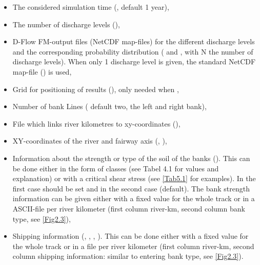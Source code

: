 \begin{itemize}
\item The considered simulation time (, default 1 year),
\item The number of discharge levels (),
\item D-Flow FM-output files (NetCDF map-files) for the different discharge levels and the corresponding probability distribution ( and , with N the number of discharge levels).
When only 1 discharge level is given, the standard NetCDF map-file () is used,
\item Grid for positioning of results (), only needed when ,
\item Number of bank Lines ( default two, the left and right bank),
\item File which links river kilometres to xy-coordinates (),
\item XY-coordinates of the river and fairway axis (, ),
\item Information about the strength or type of the soil of the banks ().
This can be done either in the form of classes (see Tabel 4.1 for values and explanation) or with a critical shear stress (see \autoref{Tab5.1} for examples).
In the first case  should be set and in the second case  (default).
The bank strength information can be given either with a fixed value for the whole track or in a ASCII-file per river kilometer (first column river-km, second column bank type, see \autoref{Fig2.3}),
\item Shipping information (, , , ).
This can be done either with a fixed value for the whole track or in a file per river kilometer (first column river-km, second column shipping information: similar to entering bank type, see \autoref{Fig2.3}).
\end{itemize}

